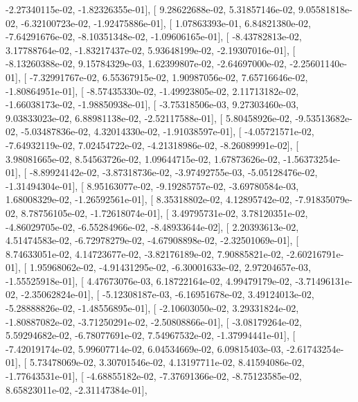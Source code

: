 \documentclass{article}
\begin{document}
         -2.27340115e-02,  -1.82326355e-01],
       [  9.28622688e-02,   5.31857146e-02,   9.05581818e-02,
         -6.32100723e-02,  -1.92475886e-01],
       [  1.07863393e-01,   6.84821380e-02,  -7.64291676e-02,
         -8.10351348e-02,  -1.09606165e-01],
       [ -8.43782813e-02,   3.17788764e-02,  -1.83217437e-02,
          5.93648199e-02,  -2.19307016e-01],
       [ -8.13260388e-02,   9.15784329e-03,   1.62399807e-02,
         -2.64697000e-02,  -2.25601140e-01],
       [ -7.32991767e-02,   6.55367915e-02,   1.90987056e-02,
          7.65716646e-02,  -1.80864951e-01],
       [ -8.57435330e-02,  -1.49923805e-02,   2.11713182e-02,
         -1.66038173e-02,  -1.98850938e-01],
       [ -3.75318506e-03,   9.27303460e-03,   9.03833023e-02,
          6.88981138e-02,  -2.52117588e-01],
       [  5.80458926e-02,  -9.53513682e-02,  -5.03487836e-02,
          4.32014330e-02,  -1.91038597e-01],
       [ -4.05721571e-02,  -7.64932119e-02,   7.02454722e-02,
         -4.21318986e-02,  -8.26089991e-02],
       [  3.98081665e-02,   8.54563726e-02,   1.09644715e-02,
          1.67873626e-02,  -1.56373254e-01],
       [ -8.89924142e-02,  -3.87318736e-02,  -3.97492755e-03,
         -5.05128476e-02,  -1.31494304e-01],
       [  8.95163077e-02,  -9.19285757e-02,  -3.69780584e-03,
          1.68008329e-02,  -1.26592561e-01],
       [  8.35318802e-02,   4.12895742e-02,  -7.91835079e-02,
          8.78756105e-02,  -1.72618074e-01],
       [  3.49795731e-02,   3.78120351e-02,  -4.86029705e-02,
         -6.55284966e-02,  -8.48933644e-02],
       [  2.20393613e-02,   4.51474583e-02,  -6.72978279e-02,
         -4.67908898e-02,  -2.32501069e-01],
       [  8.74633051e-02,   4.14723677e-02,  -3.82176189e-02,
          7.90885821e-02,  -2.60216791e-01],
       [  1.95968062e-02,  -4.91431295e-02,  -6.30001633e-02,
          2.97204657e-03,  -1.55525918e-01],
       [  4.47673076e-03,   6.18722164e-02,   4.99479179e-02,
         -3.71496131e-02,  -2.35062824e-01],
       [ -5.12308187e-03,  -6.16951678e-02,   3.49124013e-02,
         -5.28888826e-02,  -1.48556895e-01],
       [ -2.10603050e-02,   3.29331824e-02,  -1.80887082e-02,
         -3.71250291e-02,  -2.50808866e-01],
       [ -3.08179264e-02,   5.59294682e-02,  -6.78077691e-02,
          7.54967532e-02,  -1.37994441e-01],
       [ -7.42019174e-02,   5.99607714e-02,   6.04534669e-02,
          6.09815403e-03,  -2.61743254e-01],
       [  5.73478069e-02,   3.30701546e-02,   4.13197711e-02,
          8.41594086e-02,  -1.77643531e-01],
       [ -4.68855182e-02,  -7.37691366e-02,  -8.75123585e-02,
          8.65823011e-02,  -2.31147384e-01],
\end{document}
